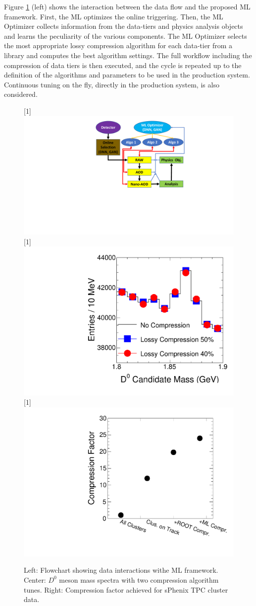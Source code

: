 Figure \ref{fig:concept} (left) shows the interaction between the data flow and the proposed ML framework. First, the ML optimizes the online triggering. Then, the ML Optimizer collects information from the data-tiers and  physics analysis objects and learns the peculiarity of the various components. The ML Optimizer selects the most appropriate lossy compression algorithm for each data-tier from a library and computes the best algorithm settings. The full workflow including the compression of data tiers is then executed, and the cycle is repeated up to the definition of the algorithms and parameters to be used in the production system. Continuous tuning on the fly, directly in the production system, is also considered.   

\begin{figure}[!ht]
    \vspace{-0.4cm}
    \begin{center}
    \scalebox{1}[1]{\includegraphics[width=.34\textwidth]{HI_Compress/figure/CompSchemaV4.pdf}}
    \hspace{0.03\textwidth}
    \scalebox{1}[1]{\includegraphics[width=.28\textwidth,keepaspectratio]{HI_Compress/figure/aleph/Performance_v6.pdf}}
     \scalebox{1}[1]{\includegraphics[width=.295\textwidth,keepaspectratio]{HI_Compress/figure/sphenix_comp_v3.pdf}}
    \vspace{-0.5cm}
    \caption{Left: Flowchart showing data interactions withe ML framework. Center: $D^0$ meson mass spectra with two compression algorithm tunes. Right: Compression factor achieved for sPhenix TPC cluster data.}
    \label{fig:concept}
    \end{center}
\end{figure}
